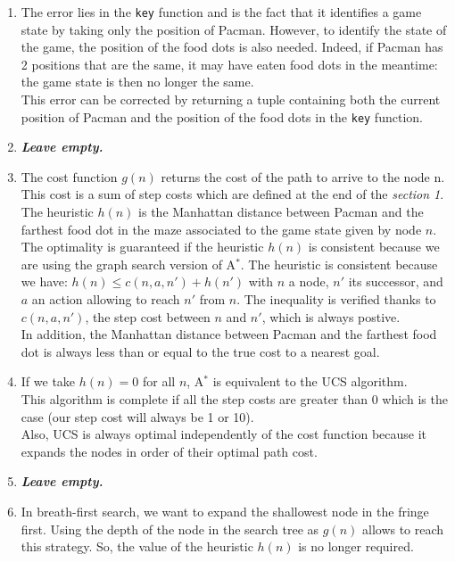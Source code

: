 \documentclass{article}
\begin{document}
\begin{enumerate}[label=\alph*.,leftmargin=1.35em]
    \item The error lies in the \texttt{key} function and is the fact that it identifies a game state by taking only the position of Pacman. However, to identify the state of the game, the position of the food dots is also needed. Indeed, if Pacman has 2 positions that are the same, it may have eaten food dots in the meantime: the game state is then no longer the same.\\
          This error can be corrected by returning a tuple containing both the current position of Pacman and the position of the food dots in the \texttt{key} function.  
    \item \textbf{{\it Leave empty.}}
    \item The cost function $g(n)$ returns the cost of the path to arrive to the node n. This cost is a sum of step costs which are defined at the end of the \textit{section 1}.\\
    The heuristic $h(n)$ is the Manhattan distance between Pacman and the farthest food dot in the maze associated to the game state given by node $n$.\\
    The optimality is guaranteed if the heuristic $h(n)$ is consistent because we are using the graph search version of A$^*$. The heuristic is consistent because we have: $h(n) \leq c(n,a,n') + h(n')$ with $n$ a node, $n'$ its successor, and $a$ an action allowing to reach $n'$ from $n$. The inequality is verified thanks to $c(n,a,n')$, the step cost between $n$ and $n'$, which is always postive.\\
    In addition, the Manhattan distance between Pacman and the farthest food dot is always less than or equal to the true cost to a nearest goal.
    \item If we take $h(n) = 0$ for all $n$, A$^*$ is equivalent to the UCS algorithm.\\
    This algorithm is complete if all the step costs are greater than 0 which is the case (our step cost will always be 1 or 10).\\
    Also, UCS is always optimal independently of the cost function because it expands the nodes in order of their optimal path cost.
    \item \textbf{{\it Leave empty.}}
    \item In breath-first search, we want to expand the shallowest node in the fringe first. Using the depth of the node in the search tree as $g(n)$ allows to reach this strategy. So, the value of the heuristic $h(n)$ is no longer required.
\end{enumerate}
\end{document}
